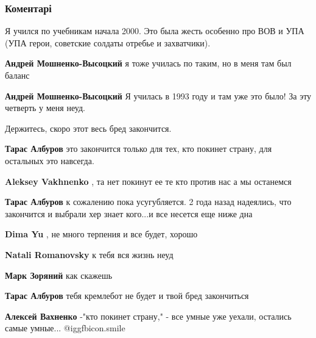  
 
 
 
 
\subsubsection{Коментарі}

\begin{itemize} %
Я учился по учебникам начала 2000. Это была жесть особенно про ВОВ и УПА (УПА герои, советские солдаты отребье и захватчики).

\begin{itemize} %
\textbf{Андрей Мошненко-Высоцкий} я тоже училась по таким, но в меня там был баланс

\textbf{Андрей Мошненко-Высоцкий} Я училась в 1993 году и там уже это было! За эту четверть у меня неуд.

Держитесь, скоро этот весь бред закончится.

\textbf{Тарас Албуров} это закончится только для тех, кто покинет страну, для остальных это навсегда.

\textbf{Aleksey Vakhnenko} , та нет покинут ее те кто против нас а мы останемся

\textbf{Тарас Албуров} к сожалению пока усугубляется. 2 года назад надеялись, что закончится и выбрали хер знает кого...и все несется еще ниже дна

\textbf{Dima Yu} , не много терпения и все будет, хорошо

\textbf{Natali Romanovsky} к тебя вся жизнь неуд

\textbf{Марк Зоряний} как скажешь

\textbf{Тарас Албуров} тебя кремлебот не будет и твой бред закончиться

\textbf{Алексей Вахненко} -"кто покинет страну,"
- все умные уже уехали, остались самые умные...  @igg{fbicon.smile} 
\end{itemize} %


\end{itemize}
